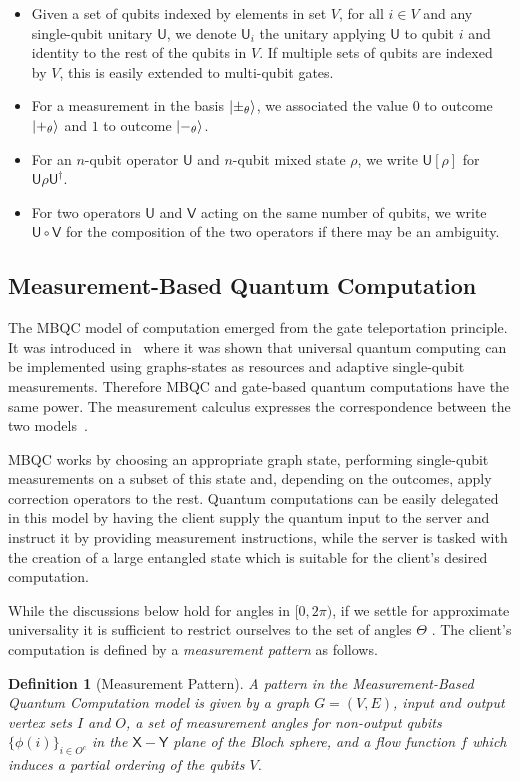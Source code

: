 \documentclass[12pt]{iopart}
\newcommand{\cptp}[1]{\mathsf{#1}} \newcommand{\pd}[1]{\mathcal{#1}}  \newcommand{\sch}[1]{\bm{#1}}
\newcommand{\X}{\cptp{X}}
\newcommand{\Y}{\cptp{Y}}
\renewcommand{\1}{\mathds{1}}
\newtheorem{definition}{Definition}
\begin{document}
\begin{itemize}
  \item Given a set of qubits indexed by elements in set $V$, for all $i \in V$ and any single-qubit unitary $\cptp U$, we denote $\cptp U_i$ the unitary applying $\cptp U$ to qubit $i$ and identity to the rest of the qubits in $V$. If multiple sets of qubits are indexed by $V$, this is easily extended to multi-qubit gates.
  \item For a measurement in the basis $\ket{\pm_\theta}$, we associated the value $0$ to outcome $\ket{+_{\theta}}$ and $1$ to outcome $\ket{-_{\theta}}$.
  \item For an $n$-qubit operator $\cptp U$ and $n$-qubit mixed state $\rho$, we write $\cptp U[\rho]$ for $\cptp U\rho\cptp U^\dagger$.
  \item For two operators $\cptp U$ and $\cptp V$ acting on the same number of qubits, we write $\cptp U \circ \cptp V$ for the composition of the two operators if there may be an ambiguity.
\end{itemize}

\subsection{Measurement-Based Quantum Computation}
\label{sec:mbqc}
The MBQC model of computation emerged from the gate teleportation principle.
It was introduced in~\cite{RB01:one} where it was shown that universal quantum computing can be implemented using graphs-states as resources and adaptive single-qubit measurements.
Therefore MBQC and gate-based quantum computations have the same power.
The measurement calculus expresses the correspondence between the two models~\cite{DKP07:measurement-calculus}. 

MBQC works by choosing an appropriate graph state, performing single-qubit measurements on a subset of this state and, depending on the outcomes, apply correction operators to the rest.
Quantum computations can be easily delegated in this model by having the client supply the quantum input to the server and instruct it by providing measurement instructions, while the server is tasked with the creation of a large entangled state which is suitable for the client's desired computation.

While the discussions below hold for angles in $[0,2\pi)$, if we settle for approximate universality it is sufficient to restrict ourselves to the set of angles $\Theta$ \cite{FK17:unconditionally}. 
The client's computation is defined by a \emph{measurement pattern} as follows.
\begin{definition}[Measurement Pattern]
  \label{def:pattern}
  A \emph{pattern} in the Measurement-Based Quantum Computation model is given by a graph $G = (V,E)$, input and output vertex sets $I$ and $O$, a set of measurement angles for non-output qubits $\{\phi(i)\}_{i\in O^c}$ in the $\X - \Y$ plane of the Bloch sphere, and a flow function $f$ which induces a partial ordering of the qubits $V$.
\end{definition}
\end{document}
